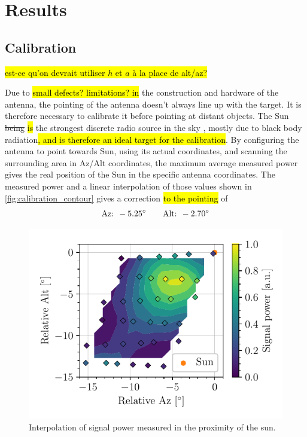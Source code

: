 \section{Results}
\subsection{Calibration}
\hl{est-ce qu'on devrait utiliser $h$ et $a$ à la place de alt/az?}

Due to \hl{small defects? limitations? in }the construction and hardware of the antenna, the pointing of the antenna doesn't always line up with the target. It is therefore necessary to calibrate it before pointing at distant objects. The Sun \st{being} \hl{is} the strongest discrete radio source in the sky \cite{burke_introduction_2013}, mostly due to black body radiation\hl{, and is therefore an ideal target for the calibration}.
By configuring the antenna to point towards Sun, using its actual coordinates, and scanning the surrounding area in Az/Alt coordinates, the maximum average measured power gives the real position of the Sun in the specific antenna coordinates. The measured power and a linear interpolation of those values shown in \autoref{fig:calibration_contour} gives a correction \hl{to the pointing} of
\begin{equation}
    \textrm{Az: } -5.25^\circ \qquad \textrm{Alt: } -2.70^\circ \\
\end{equation}
\begin{figure}[htbp]
    \centering
    \includegraphics[scale=1]{figures/calibration_contour.pdf}
    \caption{Interpolation of signal power measured in the proximity of the sun. }
    \label{fig:calibration_contour}
\end{figure}

